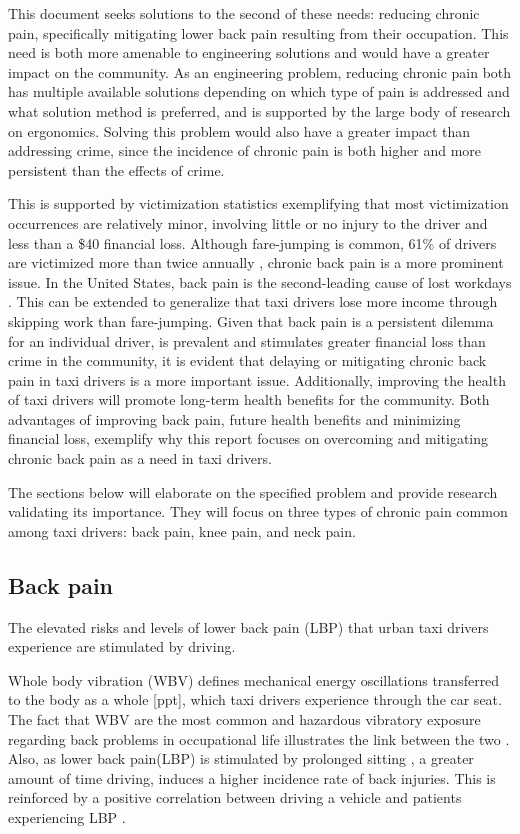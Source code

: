 \documentclass[11pt]{article}
\begin{document}
This document seeks solutions to the second of these needs: reducing
chronic pain, specifically mitigating lower back pain resulting from
their occupation. This need is both more amenable to engineering solutions
and would have a greater impact on the community. As an engineering
problem, reducing chronic pain both has multiple available solutions
depending on which type of pain is addressed and what solution method
is preferred, and is supported by the large body of research on
ergonomics. Solving this problem would also have a greater impact than
addressing crime, since the incidence of chronic pain is both higher
and more persistent than the effects of crime. 

This is supported by 
victimization statistics exemplifying that most victimization occurrences
are relatively minor, involving little or no injury to the driver and less 
than a \$40 financial loss\cite{policeverywherejustnowhere}. Although
fare-jumping is common, 61\% of drivers are victimized more than twice
annually \cite{policeverywherejustnowhere}, chronic back pain is a more 
prominent issue. In the United States, back pain is the second-leading 
cause of lost workdays \cite{LostWorkdays}. This can be extended to generalize that
taxi drivers lose more income through skipping work than fare-jumping. 
Given that back pain is a persistent dilemma for an individual driver, is prevalent\cite{68, Question?} 
and stimulates greater financial loss than crime in the community, 
it is evident that delaying or mitigating chronic back pain in taxi drivers is a 
more important issue. Additionally, improving the health of taxi drivers
will promote long-term health benefits for the community. Both advantages of 
improving back pain, future health benefits and minimizing financial loss,
exemplify why this report focuses on overcoming and mitigating 
chronic back pain as a need in taxi drivers. 


The sections below will elaborate on the specified problem and provide
research validating its importance. They will focus on three types of
chronic pain common among taxi drivers: back pain, knee pain, and neck
pain. 
\subsection{Back pain}
The elevated risks and levels of lower back pain (LBP) that urban taxi drivers 
experience are stimulated by driving. 

Whole body vibration (WBV) defines mechanical energy oscillations transferred to 
the body as a whole [ppt], which taxi drivers experience \cite{KneePain, Serious} 
through the car seat. The fact that WBV are the most common and hazardous 
vibratory exposure regarding back problems in occupational life illustrates the
link between the two \cite{ODrivers@Risk}. Also, as lower back pain(LBP) is stimulated by 
prolonged sitting \cite{Okunribido2008}, a greater amount of time driving, induces a 
higher incidence rate of back injuries\cite{Question?}. This is reinforced by a positive 
correlation between driving a vehicle and patients experiencing LBP \cite{ODrivers@Risk}. 
\end{document}
